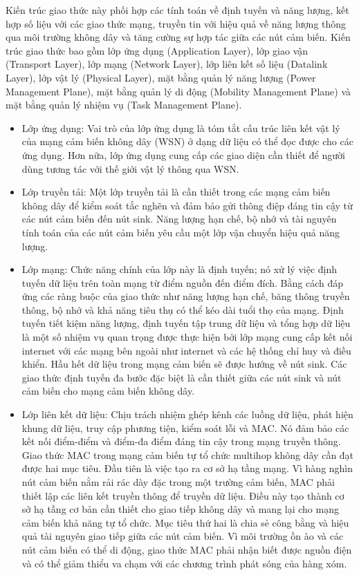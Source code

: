\documentclass{report}
\begin{document}
\indent
Kiến trúc giao thức này phối hợp các tính toán về định tuyến và năng lượng, kết hợp số liệu
với các giao thức mạng, truyền tin với hiệu quả về năng lượng thông qua môi trường không
dây và tăng cường sự hợp tác giữa các nút cảm biến. Kiến trúc giao thức bao gồm lớp ứng
dụng (Application Layer), lớp giao vận (Transport Layer), lớp mạng (Network Layer), lớp liên
kết số liệu (Datalink Layer), lớp vật lý (Physical Layer), mặt bằng quản lý năng lượng (Power
Management Plane), mặt bằng quản lý di động (Mobility Management Plane) và mặt bằng
quản lý nhiệm vụ (Task Management Plane). 
\begin{itemize}
\item Lớp ứng dụng: Vai trò của lớp ứng dụng là tóm tắt cấu trúc liên kết vật lý của mạng cảm biến không dây (WSN) ở dạng dữ liệu có thể đọc được cho các ứng dụng. Hơn nữa, lớp ứng dụng cung cấp các giao diện cần thiết để người dùng tương tác với thế giới vật lý thông qua WSN.
\item Lớp truyền tải: Một lớp truyền tải là cần thiết trong các mạng cảm biến không dây để kiểm soát tắc nghẽn và đảm bảo gửi thông điệp đáng tin cậy từ các nút cảm biến đến nút sink. Năng lượng hạn chế, bộ nhớ và tài nguyên tính toán của các nút cảm biến yêu cầu một lớp vận chuyển hiệu quả năng lượng.
\item Lớp mạng: Chức năng chính của lớp này là định tuyến; nó xử lý việc định tuyến dữ liệu trên toàn mạng từ điểm nguồn đến điểm đích. Bằng cách đáp ứng các ràng buộc của giao thức như năng lượng hạn chế, băng thông truyền thông, bộ nhớ và khả năng tiêu thụ có thể kéo dài tuổi thọ của mạng. Định tuyến tiết kiệm năng lượng, định tuyến tập trung dữ liệu và tổng hợp dữ liệu là một số nhiệm vụ quan trọng được thực hiện bởi lớp mạng cung cấp kết nối internet với các mạng bên ngoài như internet và các hệ thống chỉ huy và điều khiển. Hầu hết dữ liệu trong mạng cảm biến sẽ được hướng về nút sink. Các giao thức định tuyến đa bước đặc biệt là cần thiết giữa các nút sink và nút cảm biến cho mạng cảm biến không dây.
\item Lớp liên kết dữ liệu: Chịu trách nhiệm ghép kênh các luồng dữ liệu, phát hiện khung dữ liệu, truy cập phương tiện, kiểm soát lỗi và MAC. Nó đảm bảo các kết nối điểm-điểm và điểm-đa điểm đáng tin cậy trong mạng truyền thông. Giao thức MAC trong mạng cảm biến tự tổ chức multihop không dây cần đạt được hai mục tiêu. Đầu tiên là việc tạo ra cơ sở hạ tầng mạng. Vì hàng nghìn nút cảm biến nằm rải rác dày đặc trong một trường cảm biến, MAC phải thiết lập các liên kết truyền thông để truyền dữ liệu. Điều này tạo thành cơ sở hạ tầng cơ bản cần thiết cho giao tiếp không dây và mang lại cho mạng cảm biến khả năng tự tổ chức. Mục tiêu thứ hai là chia sẻ công bằng và hiệu quả tài nguyên giao tiếp giữa các nút cảm biến. Vì môi trường ồn ào và các nút cảm biến có thể di động, giao thức MAC phải nhận biết được nguồn điện và có thể giảm thiểu va chạm với các chương trình phát sóng của hàng xóm.

\end{itemize}
\end{document}
